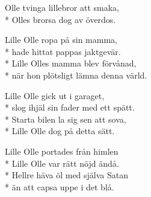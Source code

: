 \begin{SongText}
\begin{SongVerse}
        Olle tvinga lillebror att smaka,\\*%
        Olles brorsa dog av överdos.
    \end{SongVerse}
    \begin{SongVerse}
        Lille Olle ropa på sin mamma,\\*%
        hade hittat pappas jaktgevär.\\*%
        Lille Olles mamma blev förvånad,\\*%
        när hon plötsligt lämna denna värld.
    \end{SongVerse}
    \begin{SongVerse}
        Lille Olle gick ut i garaget,\\*%
        slog ihjäl sin fader med ett spätt.\\*%
        Starta bilen la sig sen att sova,\\*%
        Lille Olle dog på detta sätt.
    \end{SongVerse}
    \begin{SongVerse}
        Lille Olle portades från himlen\\*%
        Lille Olle var rätt nöjd ändå.\\*%
        Hellre häva öl med själva Satan\\*%
        än att capsa uppe i det blå.
    \end{SongVerse}
\end{SongText}
